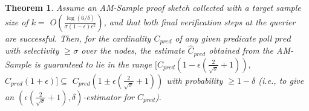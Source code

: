 \documentclass[10pt,twocolumn]{article}
\newcommand{\amsampl}{AM-Sample\xspace}
\newcommand{\proofsketch}{proof sketch\xspace}
\newcommand{\cpred}{\ensuremath{C_\mathit{pred}}\xspace}
\newcommand{\estcpred}{\ensuremath{\hat{C}_\mathit{pred}}\xspace}
\newtheorem{theorem}{Theorem}
\begin{document}
\vspace{-5pt}
\begin{theorem}
Assume an \amsampl \proofsketch collected with a target sample size of
$k=$ $O(\frac{\log(6/\delta)}{\sigma(1-\epsilon)\epsilon^2})$, and that both
final verification steps at the querier are  successful.
Then, for the cardinality $\cpred$ of any given predicate poll $\mathit{pred}$
with selectivity $\geq\sigma$ over the nodes, the estimate $\estcpred$ obtained
from the \amsampl  is guaranteed to lie in the range 
$[\cpred (1-\epsilon(\frac{2}{\sqrt{\sigma}}+1)),$ $\cpred(1+\epsilon)]\subseteq$
$\cpred (1 \pm \epsilon(\frac{2}{\sqrt{\sigma}}+1))$ with probability $\geq 1-\delta$
(i.e.,  to give an $(\epsilon(\frac{2}{\sqrt{\sigma}}+1), \delta)$-estimator
for $\cpred$).
\label{thm:amsampl}
\end{theorem}
\end{document}
